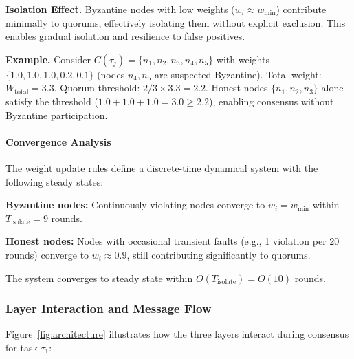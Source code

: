 \documentclass[lettersize,journal]{IEEEtran}
\begin{document}
\textbf{Isolation Effect.} Byzantine nodes with low weights ($w_i \approx w_{\min}$)
contribute minimally to quorums, effectively isolating them without explicit
exclusion. This enables gradual isolation and resilience to false positives.

\textbf{Example.} Consider $C(\tau_j) = \{n_1, n_2, n_3, n_4, n_5\}$ with
weights $\{1.0, 1.0, 1.0, 0.2, 0.1\}$ (nodes $n_4, n_5$ are
suspected Byzantine). Total weight: $W_{\text{total}} = 3.3$. Quorum
threshold: $2/3 \times 3.3 = 2.2$. Honest nodes $\{n_1, n_2, n_3\}$
alone satisfy the threshold ($1.0 + 1.0 + 1.0 = 3.0 \geq 2.2$), enabling consensus
without Byzantine participation.

\paragraph{Convergence Analysis}
\label{sec:convergence}

The weight update rules define a discrete-time dynamical system with the
following steady states:

\textbf{Byzantine nodes:} Continuously violating nodes converge to
$w_i = w_{\min}$ within $T_{\text{isolate}} = 9$ rounds.

\textbf{Honest nodes:} Nodes with occasional transient faults (e.g., 1
violation per 20 rounds) converge to $w_i \approx 0.9$, still
contributing significantly to quorums.

The system converges to steady state within
$O(T_{\text{isolate}}) = O(10)$ rounds.

\subsubsection{Layer Interaction and Message Flow}
\label{sec:layer_interaction}

Figure~\ref{fig:architecture} illustrates how the three layers interact
during consensus for task $\tau_1$:
\end{document}
